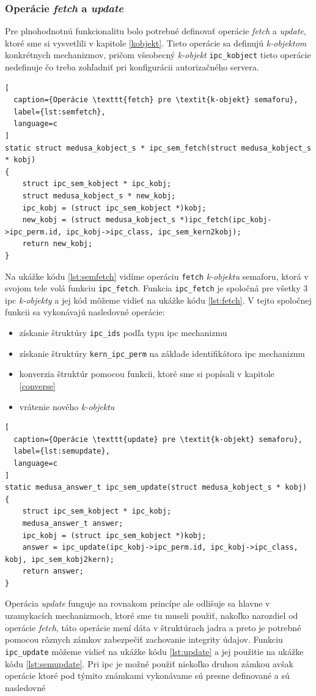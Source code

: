 \subsubsection{Operácie \textit{fetch} a \textit{update}} \label{ops}
Pre plnohodnotnú funkcionalitu bolo potrebné definovať operácie \textit{fetch} a \textit{update}, ktoré sme si vysvetlili v kapitole \ref{kobjekt}. Tieto operácie sa definujú \textit{k-objektom} konkrétnych mechanizmov, pričom všeobecný \textit{k-objekt} \texttt{ipc\_kobject} tieto operácie nedefinuje čo treba zohľadniť pri konfigurácii autorizačného servera. 
\begin{lstlisting}[
  caption={Operácie \texttt{fetch} pre \textit{k-objekt} semaforu},
  label={lst:semfetch},
  language=c
]
static struct medusa_kobject_s * ipc_sem_fetch(struct medusa_kobject_s * kobj)
{
	struct ipc_sem_kobject * ipc_kobj;
	struct medusa_kobject_s * new_kobj;
	ipc_kobj = (struct ipc_sem_kobject *)kobj;
	new_kobj = (struct medusa_kobject_s *)ipc_fetch(ipc_kobj->ipc_perm.id, ipc_kobj->ipc_class, ipc_sem_kern2kobj);
	return new_kobj;
}
\end{lstlisting}
Na ukážke kódu \ref{lst:semfetch} vidíme operáciu \texttt{fetch} \textit{k-objektu} semaforu, ktorá v svojom tele volá funkciu \texttt{ipc\_fetch}. Funkcia \texttt{ipc\_fetch} je spoločná pre všetky 3 \acrshort{ipc} \textit{k-objekty} a jej kód môžeme vidieť na ukážke kódu \ref{lst:fetch}. V tejto spoločnej funkcii sa vykonávajú nasledovné operácie:
\begin{itemize}
\item získanie štruktúry \texttt{ipc\_ids} podľa typu \acrshort{ipc} mechanizmu
\item získanie štruktúry \texttt{kern\_ipc\_perm} na základe identifikátora \acrshort{ipc} mechanizmu
\item konverzia štruktúr pomocou funkcii, ktoré sme si popísali v kapitole \ref{converse}
\item vrátenie nového \textit{k-objektu}
\end{itemize}
\begin{lstlisting}[
  caption={Operácie \texttt{update} pre \textit{k-objekt} semaforu},
  label={lst:semupdate},
  language=c
]
static medusa_answer_t ipc_sem_update(struct medusa_kobject_s * kobj)
{
	struct ipc_sem_kobject * ipc_kobj;
	medusa_answer_t answer;
	ipc_kobj = (struct ipc_sem_kobject *)kobj;
	answer = ipc_update(ipc_kobj->ipc_perm.id, ipc_kobj->ipc_class, kobj, ipc_sem_kobj2kern);
	return answer;
}
\end{lstlisting}
Operácia \textit{update} funguje na rovnakom princípe ale odlišuje sa hlavne v uzamykacích mechanizmoch, ktoré sme tu museli použiť, nakoľko narozdiel od operácie \textit{fetch}, táto operácie mení dáta v štruktúrach jadra a preto je potrebné pomocou rôznych zámkov zabezpečiť zachovanie integrity údajov. Funkciu \texttt{ipc\_update} môžeme vidieť na ukážke kódu \ref{lst:update} a jej použitie na ukážke kódu \ref{lst:semupdate}. Pri \acrshort{ipc} je možné použiť niekoľko druhou zámkou avšak operácie ktoré pod týmito známkami vykonávame sú presne definované a sú nasledovné

